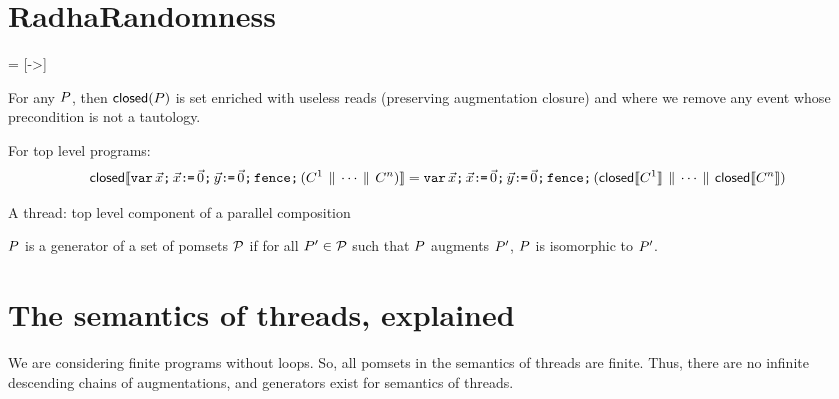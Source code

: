 \section{RadhaRandomness}

\newcommand{\acylic}{\mathit{acyclic}}

 = [->]
\newcommand{\fvarsc}{\mathit{varsc}}
\newcommand{\rvarsc}{\ensuremath{\mathrel{\mathsf{varsc}}}}%
\newcommand{\xvarsc}{\xarrowtikz{varsc}{varsc}}

\newcommand{\reads}{\mathit{Reads}}
\newcommand{\Seq}{{\tt Sequential}}

\newcommand{\writes}{\mathit{Writes}}
\newcommand{\pomf}[1]{Fun_{#1}}
\newcommand{\pomFn}{\mathit{PomFn}}
\newcommand{\power}{\mathcal{P}}
\newcommand{\aFn}{F}
\newcommand{\aRSet}{R}
\newcommand{\bRSet}{S}
\newcommand{\aWSet}{U}
\newcommand{\bWSet}{V}
\newcommand{\aWrite}{\aAct_w}
\newcommand{\bPS}{\aPS'}


For any $P$, then $\textsf{closed}(P)$ is set enriched with useless reads
(preserving augmentation closure) and where we remove any event whose
precondition is not a tautology.

For top level programs:
\begin{displaymath}
  \textsf{closed}\llbracket\texttt{var}\,\vec{x}\texttt{;}\,
    \vec{x}\texttt{:}\mkern-1mu\texttt{=}\,\vec{0}\texttt{;}\,
    \vec{y}\texttt{:}\mkern-1mu\texttt{=}\,\vec{0}\texttt{;}\,
    \texttt{fence}\texttt{;}\,
    (C^1 \,\mathbin{\|}\, \cdots \,\mathbin{\|}\, C^n)\rrbracket
  =
  \texttt{var}\,\vec{x}\texttt{;}\,
    \vec{x}\texttt{:}\mkern-1mu\texttt{=}\,\vec{0}\texttt{;}\,
    \vec{y}\texttt{:}\mkern-1mu\texttt{=}\,\vec{0}\texttt{;}\,
    \texttt{fence}\texttt{;}\,
    (\textsf{closed}\llbracket C^1\rrbracket \,\mathbin{\|}\, \cdots \,\mathbin{\|}\, \textsf{closed}\llbracket C^n\rrbracket)
\end{displaymath}

\begin{definition}
A thread: top level component of a parallel composition
\end{definition}

\begin{definition}
$P$ is a generator of a set of pomsets $\mathcal{P}$ if for all $\bPS \in \aPSS$ such that $P$ augments $\bPS$, $P$ is isomorphic to $\bPS$.
\end{definition}

\section{The semantics  of threads, explained}
We are considering finite programs without loops.  So,  all pomsets in the semantics of threads are finite.  Thus, there are no infinite descending chains of augmentations, and  generators exist for semantics of threads.

